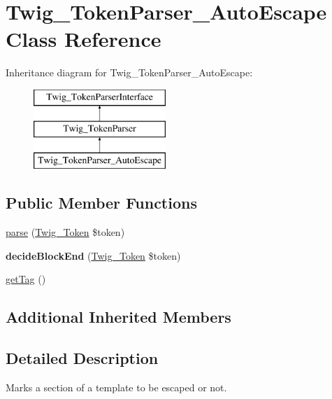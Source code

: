 \hypertarget{classTwig__TokenParser__AutoEscape}{}\section{Twig\+\_\+\+Token\+Parser\+\_\+\+Auto\+Escape Class Reference}
\label{classTwig__TokenParser__AutoEscape}
Inheritance diagram for Twig\+\_\+\+Token\+Parser\+\_\+\+Auto\+Escape\+:\begin{figure}[H]
\begin{center}
\leavevmode
\includegraphics[height=3.000000cm]{classTwig__TokenParser__AutoEscape}
\end{center}
\end{figure}
\subsection*{Public Member Functions}
\begin{DoxyCompactItemize}
\item 
\hyperlink{classTwig__TokenParser__AutoEscape_aa32ae802619a54d1a2082c5c19d454da}{parse} (\hyperlink{classTwig__Token}{Twig\+\_\+\+Token} \$token)
\item 
{\bfseries decide\+Block\+End} (\hyperlink{classTwig__Token}{Twig\+\_\+\+Token} \$token)\hypertarget{classTwig__TokenParser__AutoEscape_a56af34c1126e0ae8c10a00219d34ffbd}{}\label{classTwig__TokenParser__AutoEscape_a56af34c1126e0ae8c10a00219d34ffbd}

\item 
\hyperlink{classTwig__TokenParser__AutoEscape_a53c55bd18aa7a44698ef6fb337061075}{get\+Tag} ()
\end{DoxyCompactItemize}
\subsection*{Additional Inherited Members}


\subsection{Detailed Description}
Marks a section of a template to be escaped or not.


